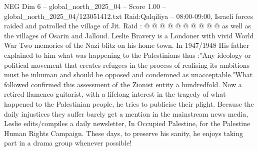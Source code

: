 \begin{textsample}{NEG Dim 6 – global\_north\_2025\_04 – Score 1.00 – global\_north\_2025\_04/123051412.txt}
Raid:Qalqiliya -- 08:00-09:00, Israeli forces raided and patrolled the village of Jit.
Raid : @ @ @ @ @ @ @ @ @ @ as well as the villages of Osarin and Jalloud.
Leslie Bravery is a Londoner with vivid World War Two memories of the Nazi blitz on his home town.
In 1947/1948 His father explained to him what was happening to the Palestinians thus :"Any ideology or political movement that creates refugees in the process of realising its ambitions must be inhuman and should be opposed and condemned as unacceptable."What followed confirmed this assessment of the Zionist entity a hundredfold.
Now a retired flamenco guitarist, with a lifelong interest in the tragedy of what happened to the Palestinian people, he tries to publicise their plight.
Because the daily injustices they suffer barely get a mention in the mainstream news media, Leslie edits/compiles a daily newsletter, In Occupied Palestine, for the Palestine Human Rights Campaign.
These days, to preserve his sanity, he enjoys taking part in a drama group whenever possible!

\end{textsample}
